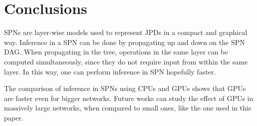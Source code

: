 \section{Conclusions}
\label{sec:conc}

SPNs are layer-wise models used to represent JPDs in a compact and graphical way.
Inference in a SPN can be done by propagating up and down on the SPN DAG.
When propagating in the tree, operations in the same layer can be computed simultaneously, since they do not require input from within the same layer.
In this way, one can perform inference in SPN hopefully faster.


The comparison of inference in SPNs using CPUs and GPUs shows that GPUs are faster even for bigger networks.
Future works can study the effect of GPUs in massively large networks, when compared to small ones, like the one used in this paper.